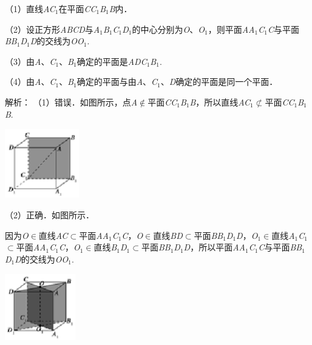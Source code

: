 \documentclass{article} %
\begin{document}
（1）直线\textit{AC}${}_{1}$在平面\textit{CC}${}_{1}$\textit{B}${}_{1}$\textit{B}内．

（2）设正方形\textit{ABCD}与\textit{A}${}_{1}$\textit{B}${}_{1}$\textit{C}${}_{1}$\textit{D}${}_{1}$的中心分别为\textit{O}、\textit{O}${}_{1}$，则平面\textit{AA}${}_{1}$\textit{C}${}_{1}$\textit{C}与平面\textit{BB}${}_{1}$\textit{D}${}_{1}$\textit{D}的交线为\textit{OO}${}_{1}$.

（3）由\textit{A}、\textit{C}${}_{1}$、\textit{B}${}_{1}$确定的平面是\textit{ADC}${}_{1}$\textit{B}${}_{1}$.

（4）由\textit{A}、\textit{C}${}_{1}$、\textit{B}${}_{1}$确定的平面与由\textit{A}、\textit{C}${}_{1}$、\textit{D}确定的平面是同一个平面．

解析：
（1）错误．如图所示，点\textit{A}$\mathrm{\notin}$平面\textit{CC}${}_{1}$\textit{B}${}_{1}$\textit{B}，所以直线\textit{AC}${}_{1}$$\mathrm{\nsubset}$平面\textit{CC}${}_{1}$\textit{B}${}_{1}$\textit{B}.

\includegraphics*[width=1.27in, height=1.19in, keepaspectratio=false]{image88}

（2）正确．如图所示．

因为\textit{O}$\mathrm{\in}$直线\textit{AC}$\mathrm{\subset }$平面\textit{AA}${}_{1}$\textit{C}${}_{1}$\textit{C}，\textit{O}$\mathrm{\in}$直线\textit{BD}$\mathrm{\subset }$平面\textit{BB}${}_{1}$\textit{D}${}_{1}$\textit{D}，\textit{O}${}_{1}$$\mathrm{\in}$直线\textit{A}${}_{1}$\textit{C}${}_{1}$$\mathrm{\subset }$平面\textit{AA}${}_{1}$\textit{C}${}_{1}$\textit{C}，\textit{O}${}_{1}$$\mathrm{\in}$直线\textit{B}${}_{1}$\textit{D}${}_{1}$$\mathrm{\subset }$平面\textit{BB}${}_{1}$\textit{D}${}_{1}$\textit{D}，所以平面\textit{AA}${}_{1}$\textit{C}${}_{1}$\textit{C}与平面\textit{BB}${}_{1}$\textit{D}${}_{1}$\textit{D}的交线为\textit{OO}${}_{1}$.

\includegraphics*[width=1.21in, height=1.15in, keepaspectratio=false]{image89}
\end{document}
